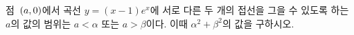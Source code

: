 점~$(a{,}\mkern3mu\mathopen{}0)$에서 곡선 $y=(x-1)e^x$에 서로 다른 두 개의 접선을 그을 수 있도록 하는 $a$의 값의 범위는 $a<\alpha$ 또는 $a>\beta$이다. 이때 $\alpha^2+\beta^2$의 값을 구하시오.
